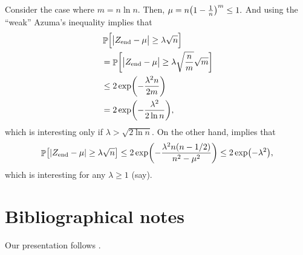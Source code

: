 Consider the case where $m = n \ln n$. Then,
\begin{math}
    \mu = n \pth[]{1-\frac{1}{n}}^m \leq 1.
\end{math}
And using the ``weak'' Azuma's inequality implies that
\begin{align*}
  &\Prob{ \Bigl. \cardin{\bigl. Z_{\textrm{end}} - \mu}
  \geq  \lambda \sqrt{n} }
  \\&=
  \Prob{ \biggl. \cardin{\bigl. Z_{\textrm{end}} - \mu} \geq \lambda
  \sqrt{\frac{n}{m}} \sqrt{m} }
  \\&\leq
  2 \exp \pth{ - \frac{\lambda^2n}{2m}}
  \\&=
  2 \exp \pth{ - \frac{\lambda^2}{2\ln n}},%
\end{align*}
which is interesting only if $\lambda > \sqrt{ 2 \ln n}$. On the other
hand,  implies that
\begin{align*}
  \Prob{ \bigl. \cardin{ Z_{\textrm{end}} - \mu} \geq \lambda
  \sqrt{n} }%
  \leq%
  2 \exp \pth{ - \frac{\lambda^2 n (n-1/2)}{n^2 -
  \mu^2}} %
  \leq%
  2 \exp \pth{ - \lambda^2 },
\end{align*}
which is interesting for any $\lambda \geq 1$ (say).

\section{Bibliographical notes}

Our presentation follows \cite{mr-ra-95}.

\ChapterEnd{}

